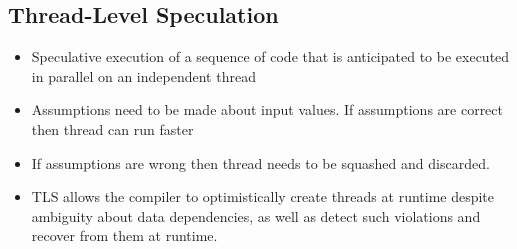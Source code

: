 \documentclass{article}
\begin{document}
\subsection{Thread-Level Speculation}
\begin{itemize}
    \item Speculative execution of a sequence of code that is anticipated to be executed in parallel on an independent thread
    
    \item Assumptions need to be made about input values. If assumptions are correct then thread can run faster
    
    \item If assumptions are wrong then thread needs to be squashed and discarded. 
    
    \item TLS allows the compiler to optimistically create threads at runtime despite ambiguity about data dependencies, as well as detect such violations and recover from them at runtime. 
\end{itemize}
\end{document}
